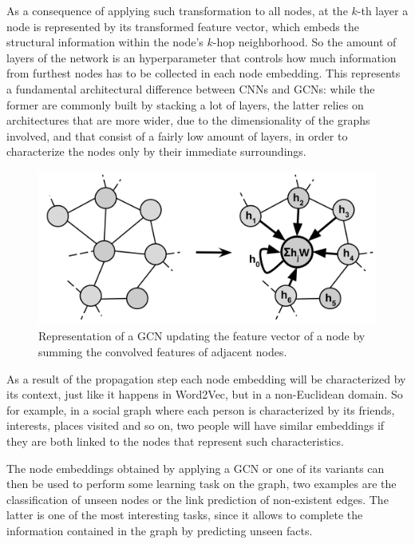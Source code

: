 \documentclass[%
    corpo=13.5pt,
    twoside,
    oldstyle,
    tipotesi=magistrale,
    greek,
    evenboxes
]{toptesi}
\begin{document}
As a consequence of applying such transformation to all nodes, at the
$k$-th layer a node is represented by its transformed feature vector, which
embeds the structural information within the node's $k$-hop neighborhood.
So the amount of layers of the network is an hyperparameter that controls how much
information from furthest nodes has to be collected in each node embedding.
This represents a fundamental architectural difference between CNNs and GCNs:
while the former are commonly built by stacking a lot of layers, the latter
relies on architectures that are more wider, due to the dimensionality of the
graphs involved, and that consist of a fairly low amount of layers, in order to
characterize the nodes only by their immediate surroundings.


\begin{figure}[h]
    \centering
    \includegraphics[scale=0.3]{img/gcn.png}
    \caption{Representation of a GCN updating the feature vector of a node
        by summing the convolved features of adjacent nodes.}
    \label{fig:gcn}
\end{figure}

As a result of the propagation step each node embedding will be characterized by
its context, just like it happens in Word2Vec, but in a non-Euclidean domain.
So for example, in a social graph where each person is characterized by its
friends, interests, places visited and so on, two people will have similar
embeddings if they are both linked to the nodes that represent such
characteristics.

The node embeddings obtained by applying a GCN or one of its variants can
then be used to perform some learning task on the graph, two examples are
the classification of unseen nodes or the link prediction of non-existent
edges. The latter is one of the most interesting tasks, since it allows to
complete the information contained in the graph by predicting unseen facts.
\end{document}
